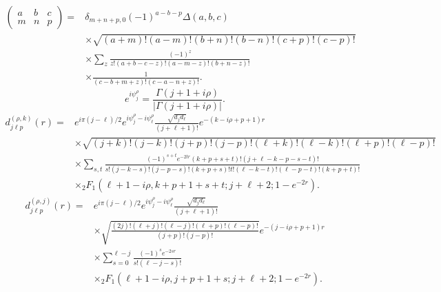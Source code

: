 \documentclass{article}
\begin{document}
\begin{equation}
\begin{aligned}
\begin{pmatrix}a&b&c\\m&n&p\end{pmatrix}={}&\delta_{m+n+p,0}(-1)^{a-b-p}\Delta(a,b,c)\\
&\times\sqrt{(a+m)!(a-m)!(b+n)!(b-n)!(c+p)!(c-p)!}\\
&\times\sum_z\frac{(-1)^z}{z!(a+b-c-z)!(a-m-z)!(b+n-z)!}\\
&\times\frac1{(c-b+m+z)!(c-a-n+z)!}.
\end{aligned}
\tag{R4}
\end{equation}
\begin{equation}
e^{i\psi_j^\rho}=\frac{\Gamma(j+1+i\rho)}{|\Gamma(j+1+i\rho)|}.
\tag{M1}
\end{equation}
\begin{equation}
\begin{aligned}
d^{(\rho,k)}_{j\ell p}(r)={}&e^{i\pi(j-\ell)/2}e^{i\psi_j^\rho-i\psi_\ell^\rho}\frac{\sqrt{d_jd_\ell}}{(j+\ell+1)!}e^{-(k-i\rho+p+1)r}\\
&\times\sqrt{(j+k)!(j-k)!(j+p)!(j-p)!(\ell+k)!(\ell-k)!(\ell+p)!(\ell-p)!}\\
&\times\sum_{s,t}\frac{(-1)^{s+t}e^{-2tr}(k+p+s+t)!(j+\ell-k-p-s-t)!}
{s!(j-k-s)!(j-p-s)!(k+p+s)!t!(\ell-k-t)!(\ell-p-t)!(k+p+t)!}\\
&\times{}_2F_1(\ell+1-i\rho,k+p+1+s+t;j+\ell+2;1-e^{-2r}).
\end{aligned}
\tag{M2}
\end{equation}
\begin{equation}
\begin{aligned}
d^{(\rho,j)}_{j\ell p}(r)={}&e^{i\pi(j-\ell)/2}e^{i\psi_j^\rho-i\psi_\ell^\rho}\frac{\sqrt{d_jd_\ell}}{(j+\ell+1)!}\\
&\times\sqrt{\frac{(2j)!(\ell+j)!(\ell-j)!(\ell+p)!(\ell-p)!}{(j+p)!(j-p)!}}e^{-(j-i\rho+p+1)r}\\
&\times\sum_{s=0}^{\ell-j}\frac{(-1)^se^{-2sr}}{s!(\ell-j-s)!}\\
&\times{}_2F_1(\ell+1-i\rho,j+p+1+s;j+\ell+2;1-e^{-2r}).
\end{aligned}
\tag{M3}
\end{equation}
\end{document}

